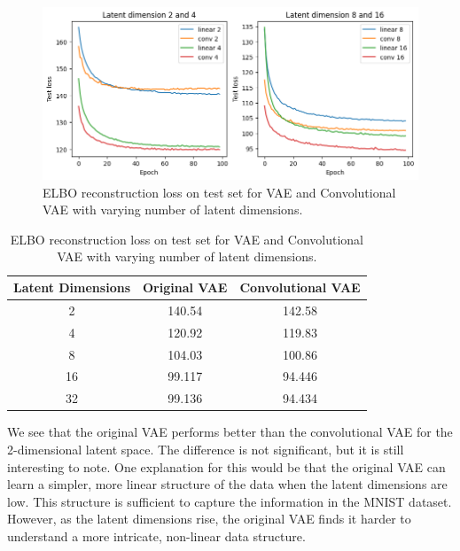 \begin{figure}[h]
\centering
\includegraphics[width=\textwidth]{images/test_loss.png}
\setlength{\belowcaptionskip}{-10pt}
\caption{ELBO reconstruction loss on test set for VAE and Convolutional VAE with varying number of latent dimensions.}
\label{fig:vaeloss}
\end{figure}

\begin{table}
\centering
\begin{tabular}{|c|c|c|}
\hline
\multicolumn{1}{|c|}{\textbf{Latent Dimensions}} & \multicolumn{1}{c|}{\textbf{Original VAE}} & \multicolumn{1}{c|}{\textbf{Convolutional VAE}} \\ \hline
\multicolumn{1}{|c|}{2} & \multicolumn{1}{c|}{140.54} & \multicolumn{1}{c|}{142.58}  \\ \hline
\multicolumn{1}{|c|}{4} & \multicolumn{1}{c|}{120.92} & \multicolumn{1}{c|}{119.83}  \\ \hline
\multicolumn{1}{|c|}{8} & \multicolumn{1}{c|}{104.03} & \multicolumn{1}{c|}{100.86}  \\ \hline
\multicolumn{1}{|c|}{16} & \multicolumn{1}{c|}{99.117} & \multicolumn{1}{c|}{94.446}  \\ \hline
\multicolumn{1}{|c|}{32} & \multicolumn{1}{c|}{99.136} & \multicolumn{1}{c|}{94.434}  \\ \hline
\end{tabular}
\vspace*{0.5cm}
\setlength{\belowcaptionskip}{-10pt}
\caption{ELBO reconstruction loss on test set for VAE and Convolutional VAE with varying number of latent dimensions.}
\label{tab:vaeloss}
\end{table}

We see that the original VAE performs better than the convolutional VAE for the 2-dimensional latent space. The difference is not significant, but it is still interesting to note. One explanation for this would be that the original VAE can learn a simpler, more linear structure of the data when the latent dimensions are low. This structure is sufficient to capture the information in the MNIST dataset. However, as the latent dimensions rise, the original VAE finds it harder to understand a more intricate, non-linear data structure.

